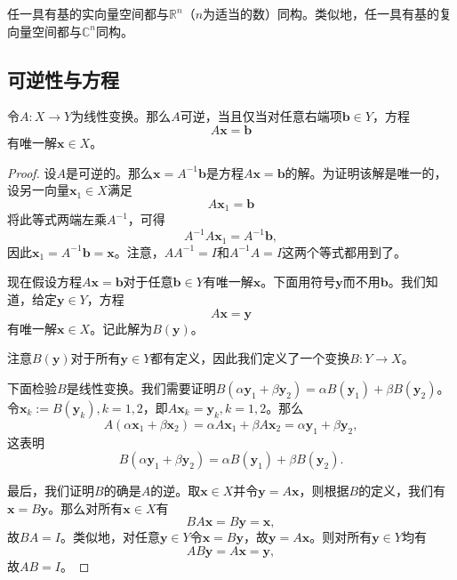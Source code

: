 \begin{remark*}
    任一具有基的实向量空间都与$\mathbb{R}^n$（$n$为适当的数）同构。类似地，任一具有基的复向量空间都与$\mathbb{C}^n$同构。
\end{remark*}

\subsection{可逆性与方程}\label{subsec:invert_eq}

\begin{theorem}\label{thm:invert_unique}
    令$A:X\to Y$为线性变换。那么$A$可逆，当且仅当对任意右端项$\mathbf{b}\in Y$，方程\[A\mathbf{x}=\mathbf{b}\]有唯一解$\mathbf{x}\in X$。
\end{theorem}
\begin{proof}
    设$A$是可逆的。那么$\mathbf{x}=A^{-1}\mathbf{b}$是方程$A\mathbf{x}=\mathbf{b}$的解。为证明该解是唯一的，设另一向量$\mathbf{x}_1\in X$满足\[A\mathbf{x}_1=\mathbf{b}\]
    将此等式两端左乘$A^{-1}$，可得\[A^{-1}A\mathbf{x}_{1}=A^{-1}\mathbf{b},\]
    因此$\mathbf{x}_{1}=A^{-1}\mathbf{b}=\mathbf{x}$。注意，$AA^{-1}=I$和$A^{-1}A=I$这两个等式都用到了。

    现在假设方程$A\mathbf{x}=\mathbf{b}$对于任意$\mathbf{b}\in Y$有唯一解$\mathbf{x}$。下面用符号$\mathbf{y}$而不用$\mathbf{b}$。我们知道，给定$\mathbf{y}\in Y$，方程\[A\mathbf{x}=\mathbf{y}\]有唯一解$\mathbf{x}\in X$。记此解为$B(\mathbf{y})$。

    注意$B(\mathbf{y})$对于所有$\mathbf{y}\in Y$都有定义，因此我们定义了一个变换$B:Y\to X$。

    下面检验$B$是线性变换。我们需要证明$B(\alpha\mathbf{y}_{1}+\beta\mathbf{y}_{2})=\alpha B(\mathbf{y}_{1})+\beta B(\mathbf{y}_{2})$。令$\mathbf{x}_{k}:=B(\mathbf{y}_{k}),k=1,2$，即$A\mathbf{x}_{k}=\mathbf{y}_{k},k=1,2$。那么\[A(\alpha\mathbf{x}_1+\beta\mathbf{x}_2)=\alpha A\mathbf{x}_1+\beta A\mathbf{x}_2=\alpha\mathbf{y}_1+\beta\mathbf{y}_2,\]
    这表明\[B(\alpha\mathbf{y}_1+\beta\mathbf{y}_2)=\alpha B(\mathbf{y}_1)+\beta B(\mathbf{y}_2).\]

    最后，我们证明$B$的确是$A$的逆。取$\mathbf{x}\in X$并令$\mathbf{y}=A\mathbf{x}$，则根据$B$的定义，我们有$\mathbf{x}=B\mathbf{y}$。那么对所有$\mathbf{x}\in X$有\[BA\mathbf{x}=B\mathbf{y}=\mathbf{x},\]
    故$BA=I$。类似地，对任意$\mathbf{y}\in Y$令$\mathbf{x}=B\mathbf{y}$，故$\mathbf{y}=A\mathbf{x}$。则对所有$\mathbf{y}\in Y$均有\[AB\mathbf{y}=A\mathbf{x}=\mathbf{y},\]
    故$AB=I$。
\end{proof}

